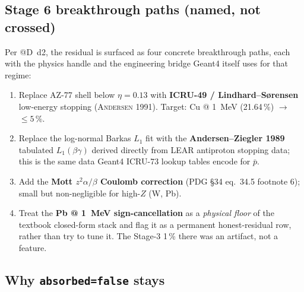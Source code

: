 \noindent{}

\subsection{Stage 6 breakthrough paths (named, not crossed)}
\label{app:bethe-stage6}

Per @D~d2, the residual is surfaced as four concrete breakthrough paths,
each with the physics handle and the engineering bridge Geant4 itself
uses for that regime:

\begin{enumerate}\itemsep0.2em
\item Replace AZ-77 shell below $\eta\!=\!0.13$ with
  \textbf{ICRU-49 / Lindhard--Sørensen} low-energy stopping
  (\textsc{Andersen 1991}). Target: Cu @ \SI{1}{MeV} (21.64\,\%)
  $\to$ $\le\!5\,\%$.
\item Replace the log-normal Barkas $L_1$ fit with the
  \textbf{Andersen--Ziegler 1989} tabulated $L_1(\beta\gamma)$ derived
  directly from LEAR antiproton stopping data; this is the same data
  Geant4 ICRU-73 lookup tables encode for $\bar{p}$.
\item Add the \textbf{Mott $z^2\alpha/\beta$ Coulomb correction}
  (PDG \S34 eq.~34.5 footnote 6); small but non-negligible for
  high-$Z$ (W, Pb).
\item Treat the \textbf{Pb @ \SI{1}{MeV} sign-cancellation} as a
  \emph{physical floor} of the textbook closed-form stack and flag it as
  a permanent honest-residual row, rather than try to tune it. The
  Stage-3 1\,\% there was an artifact, not a feature.
\end{enumerate}

\subsection{Why \texttt{absorbed=false} stays}
\label{app:bethe-stage5-absorbed}

